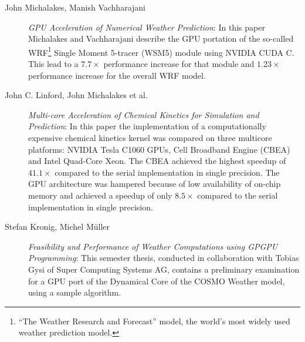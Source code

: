 \begin{description}
 \item [John Michalakes, Manish Vachharajani] \textit{GPU Acceleration of Numerical Weather Prediction}: In this paper Michalakes and Vachharajani describe the GPU portation of the so-called WRF\footnote{``The Weather Research and Forecast'' model, the world's most widely used weather prediction model.} Single Moment 5-tracer (WSM5) module using NVIDIA CUDA C. This lead to a $7.7\times$ performance increase for that module and $1.23\times$ performance increase for the overall WRF model.~\cite{Michalakes}
 
 \item [John C. Linford, John Michalakes et al.] \textit{Multi-core Acceleration of Chemical Kinetics for Simulation and Prediction}: In this paper the implementation of a computationally expensive chemical kinetics kernel was compared on three multicore platforms: NVIDIA Tesla C1060 GPUs, Cell Broadband Engine (CBEA) and Intel Quad-Core Xeon. The CBEA achieved the highest speedup of $41.1\times$ compared to the serial implementation in single precision. The GPU architecture was hampered because of low availability of on-chip memory and achieved a speedup of only $8.5\times$ compared to the serial implementation in single precision.~\cite{Linford}
 
 \item [Stefan Kronig, Michel M\"{u}ller] \textit{Feasibility and Performance of Weather Computations using GPGPU Programming}: This semester thesis, conducted in collaboration with Tobias Gysi of Super Computing Systems AG, contains a preliminary examination for a GPU port of the Dynamical Core of the COSMO Weather model, using a sample algorithm.~\cite{MuellerKronig}
\end{description}
